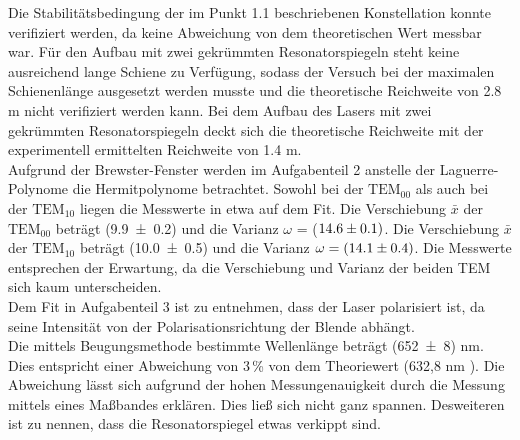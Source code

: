 Die Stabilitätsbedingung der im Punkt 1.1 beschriebenen Konstellation konnte verifiziert werden, da keine Abweichung von dem theoretischen Wert messbar war. Für den Aufbau mit zwei gekrümmten Resonatorspiegeln steht keine ausreichend lange Schiene zu Verfügung, sodass der Versuch bei der maximalen Schienenlänge ausgesetzt werden musste und die theoretische Reichweite von 2.8 m nicht verifiziert werden kann. Bei dem Aufbau des Lasers mit zwei gekrümmten Resonatorspiegeln deckt sich die theoretische Reichweite mit der experimentell ermittelten Reichweite von 1.4 m. \\
Aufgrund der Brewster-Fenster werden im Aufgabenteil 2 anstelle der Laguerre-Polynome die Hermitpolynome betrachtet. Sowohl bei der $\text{TEM}_{00}$ als auch bei der $\text{TEM}_{10}$ liegen die Messwerte in etwa auf dem Fit. Die Verschiebung $\bar{x}$ der $\text{TEM}_{00}$ beträgt (\num{9.9 +- 0.2}) und die Varianz $\omega$ = ($\num{14.6 +- 0.1})$. Die Verschiebung $\bar{x}$ der $\text{TEM}_{10}$ beträgt (\num{10.0 +- 0.5}) und die Varianz $\omega = (\num{14.1 +- 0.4})$. Die Messwerte entsprechen der Erwartung, da die Verschiebung und Varianz der beiden TEM sich kaum unterscheiden. 	\\
Dem Fit in Aufgabenteil 3 ist zu entnehmen, dass der Laser polarisiert ist, da seine Intensität von der Polarisationsrichtung der Blende abhängt. \\
Die mittels Beugungsmethode bestimmte Wellenlänge beträgt (\num{652 +- 8}) nm. Dies entspricht einer Abweichung von 3\,\% von dem Theoriewert (632,8 nm \cite{V61}). Die Abweichung lässt sich aufgrund der hohen Messungenauigkeit durch die Messung mittels eines Maßbandes erklären. Dies ließ sich nicht ganz spannen. Desweiteren ist zu nennen, dass die Resonatorspiegel etwas verkippt sind.
